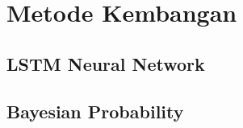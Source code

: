 \chapter{Metode Kembangan}

\section{LSTM Neural Network}
\blindtext

\section{Bayesian Probability}
\blindtext

